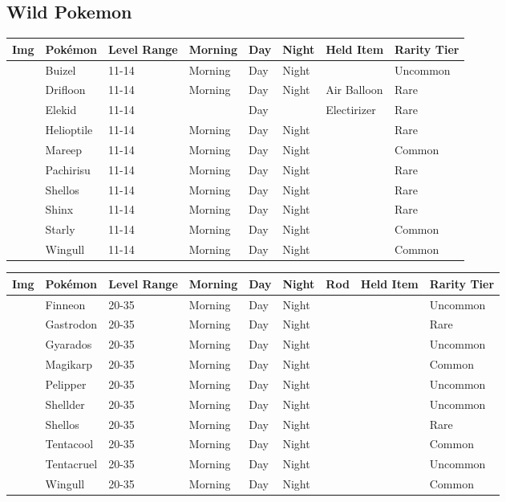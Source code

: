 \subsection{Wild Pokemon}%
\label{subsec:WildPokemon}%
\begin{longtable}{||l l l l l l l l||}%
\hline%
Img&Pokémon&Level Range&Morning&Day&Night&Held Item&Rarity Tier\\%
\hline%
\endhead%
\hline%
&Buizel&11{-}14&Morning&Day&Night&&Uncommon\\%
\hline%
&Drifloon&11{-}14&Morning&Day&Night&Air Balloon&Rare\\%
\hline%
&Elekid&11{-}14&&Day&&Electirizer&Rare\\%
\hline%
&Helioptile&11{-}14&Morning&Day&Night&&Rare\\%
\hline%
&Mareep&11{-}14&Morning&Day&Night&&Common\\%
\hline%
&Pachirisu&11{-}14&Morning&Day&Night&&Rare\\%
\hline%
&Shellos&11{-}14&Morning&Day&Night&&Rare\\%
\hline%
&Shinx&11{-}14&Morning&Day&Night&&Rare\\%
\hline%
&Starly&11{-}14&Morning&Day&Night&&Common\\%
\hline%
&Wingull&11{-}14&Morning&Day&Night&&Common\\%
\hline%
\end{longtable}%
\begin{longtable}{||l l l l l l l l l||}%
\hline%
Img&Pokémon&Level Range&Morning&Day&Night&Rod&Held Item&Rarity Tier\\%
\hline%
\endhead%
\hline%
&Finneon&20{-}35&Morning&Day&Night&&&Uncommon\\%
\hline%
&Gastrodon&20{-}35&Morning&Day&Night&&&Rare\\%
\hline%
&Gyarados&20{-}35&Morning&Day&Night&&&Uncommon\\%
\hline%
&Magikarp&20{-}35&Morning&Day&Night&&&Common\\%
\hline%
&Pelipper&20{-}35&Morning&Day&Night&&&Uncommon\\%
\hline%
&Shellder&20{-}35&Morning&Day&Night&&&Uncommon\\%
\hline%
&Shellos&20{-}35&Morning&Day&Night&&&Rare\\%
\hline%
&Tentacool&20{-}35&Morning&Day&Night&&&Common\\%
\hline%
&Tentacruel&20{-}35&Morning&Day&Night&&&Uncommon\\%
\hline%
&Wingull&20{-}35&Morning&Day&Night&&&Common\\%
\hline%
\end{longtable}